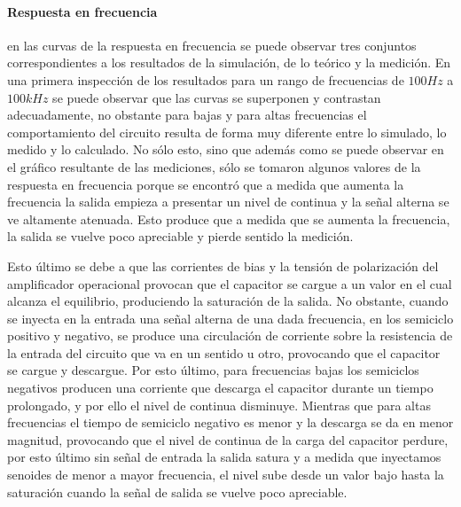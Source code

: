 \paragraph*{Respuesta en frecuencia} en las curvas de la respuesta en frecuencia se puede observar tres conjuntos correspondientes a los resultados de la 
simulaci\'on, de lo te\'orico y la medici\'on. En una primera inspecci\'on de los resultados para un rango de frecuencias de $100Hz$ a $100kHz$ se puede observar que
las curvas se superponen y contrastan adecuadamente, no obstante para bajas y para altas frecuencias el comportamiento del circuito resulta de forma muy diferente entre lo simulado,
lo medido y lo calculado. No s\'olo esto, sino que adem\'as como se puede observar en el gr\'afico resultante de las mediciones, s\'olo se tomaron algunos valores de la respuesta en frecuencia
porque se encontr\'o que a medida que aumenta la frecuencia la salida empieza a presentar un nivel de continua y la se\~nal alterna se ve altamente atenuada. Esto produce que a medida que se aumenta
la frecuencia, la salida se vuelve poco apreciable y pierde sentido la medici\'on.

Esto \'ultimo se debe a que las corrientes de bias y la tensi\'on de polarizaci\'on del amplificador operacional provocan que el capacitor se cargue a un valor en el cual alcanza el equilibrio,
produciendo la saturaci\'on de la salida. No obstante, cuando se inyecta en la entrada una se\~nal alterna de una dada frecuencia, en los semiciclo positivo y negativo, se produce una circulaci\'on de corriente
sobre la resistencia de la entrada del circuito que va en un sentido u otro, provocando que el capacitor se cargue y descargue. Por esto \'ultimo, para frecuencias bajas los semiciclos negativos producen una corriente que descarga el capacitor
durante un tiempo prolongado, y por ello el nivel de continua disminuye. Mientras que para altas frecuencias el tiempo de semiciclo negativo es menor y la descarga se da en menor magnitud, provocando que el nivel de continua
de la carga del capacitor perdure, por esto \'ultimo sin se\~nal de entrada la salida satura y a medida que inyectamos senoides de menor a mayor frecuencia, el nivel sube desde un valor bajo hasta la saturaci\'on cuando la se\~nal de salida
se vuelve poco apreciable.

